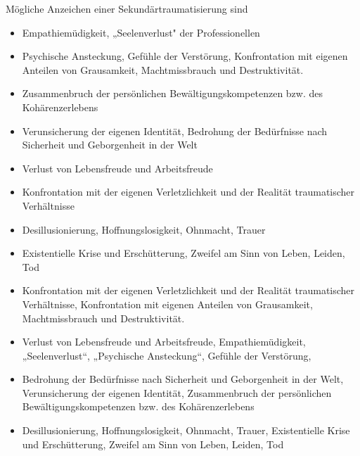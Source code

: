 {{Mögliche Anzeichen einer Sekundärtraumatisierung sind
\begin{itemize}
  \item Empathiemüdigkeit, „Seelenverlust" der Professionellen
  \item Psychische Ansteckung, Gefühle der Verstörung,
  Konfrontation mit eigenen Anteilen von Grausamkeit,
  Machtmissbrauch und Destruktivität.
  \item Zusammenbruch der
  persönlichen Bewältigungskompetenzen bzw. des
  Kohärenzerlebens
  \item Verunsicherung der eigenen Identität,
  Bedrohung der Bedürfnisse nach Sicherheit und Geborgenheit
  in der Welt
  \item Verlust von Lebensfreude und Arbeitsfreude
  \item Konfrontation mit der eigenen Verletzlichkeit und der
  Realität traumatischer Verhältnisse
  \item Desillusionierung,
  Hoffnungslosigkeit, Ohnmacht, Trauer
  \item Existentielle
  Krise und Erschütterung, Zweifel am Sinn von Leben, Leiden,
  Tod
\end{itemize}}
{}
{}
{}
{}

\begin{itemize}
  \item  Konfrontation mit der eigenen Verletzlichkeit und der
  Realität traumatischer Verhältnisse, Konfrontation mit eigenen Anteilen von Grausamkeit, Machtmissbrauch und Destruktivität.
  \item Verlust von Lebensfreude und Arbeitsfreude, Empathiemüdigkeit, „Seelenverlust“, „Psychische Ansteckung“, Gefühle der Verstörung,
  \item Bedrohung der Bedürfnisse nach Sicherheit und Geborgenheit
  in der Welt, Verunsicherung der eigenen Identität, Zusammenbruch der
  persönlichen Bewältigungskompetenzen bzw. des
  Kohärenzerlebens
  \item Desillusionierung, Hoffnungslosigkeit, Ohnmacht, Trauer, Existentielle Krise und Erschütterung, Zweifel am Sinn von Leben, Leiden, Tod
\end{itemize}}



